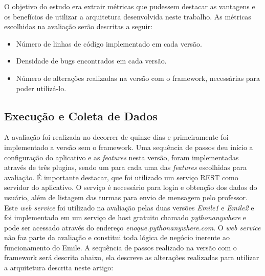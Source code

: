O objetivo do estudo era extrair métricas que pudessem destacar as vantagens e os benefícios de utilizar a arquitetura desenvolvida neste trabalho. As métricas escolhidas na avaliação serão descritas a seguir:

\begin{itemize}
	\item Número de linhas de código implementado em cada versão.

	\item Densidade de bugs encontrados em cada versão.

	\item Número de alterações realizadas na versão com o framework, necessárias para poder utilizá-lo.
\end{itemize}

\subsection{Execução e Coleta de Dados}
A avaliação foi realizada no decorrer de quinze dias e primeiramente foi implementado a versão sem o framework. Uma sequência de passos deu início a configuração do aplicativo e as \textit{features} nesta versão, foram implementadas através de três plugins, sendo um para cada uma das \textit{features} escolhidas para avaliação. É importante destacar, que foi utilizado um serviço REST  como servidor do aplicativo. O serviço é necessário para login e obtenção dos dados do usuário, além de listagem das turmas para envio de mensagem pelo professor. Este \textit{web service} foi utilizado na avaliação pelas duas versões \textit{Emile1} e \textit{Emile2} e foi implementado em um serviço de host gratuito chamado \textit{pythonanywhere} e pode ser acessado através do endereço \textit{enoque.pythonanywhere.com}. O \textit{web service} não faz parte da avaliação e constitui toda lógica de negócio inerente ao funcionamento do Emile. A sequência de passos realizado na versão com o framework será descrita abaixo, ela descreve as alterações realizadas para utilizar a arquitetura descrita neste artigo:

